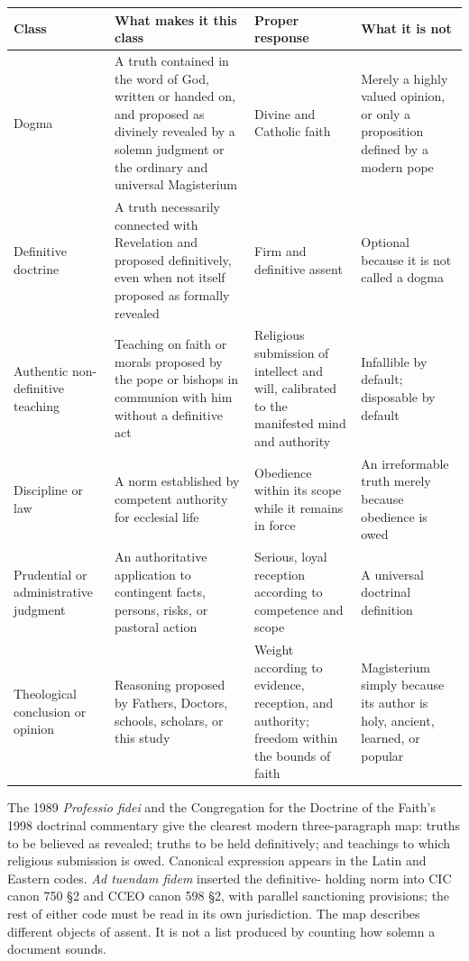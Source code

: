 \begin{longtable}{>{\raggedright\arraybackslash}p{}>{\raggedright\arraybackslash}p{}>{\raggedright\arraybackslash}p{}>{\raggedright\arraybackslash}p{}}
\toprule
Class & What makes it this class & Proper response & What it is not\\
\midrule
\endhead
Dogma & A truth contained in the word of God, written or handed on, and
proposed as divinely revealed by a solemn judgment or the ordinary and
universal Magisterium & Divine and Catholic faith & Merely a highly valued
opinion, or only a proposition defined by a modern pope\\
Definitive doctrine & A truth necessarily connected with Revelation and
proposed definitively, even when not itself proposed as formally revealed &
Firm and definitive assent & Optional because it is not called a dogma\\
Authentic non-definitive teaching & Teaching on faith or morals proposed by
the pope or bishops in communion with him without a definitive act &
Religious submission of intellect and will, calibrated to the manifested mind
and authority & Infallible by default; disposable by default\\
Discipline or law & A norm established by competent authority for ecclesial
life & Obedience within its scope while it remains in force & An irreformable
truth merely because obedience is owed\\
Prudential or administrative judgment & An authoritative application to
contingent facts, persons, risks, or pastoral action & Serious, loyal reception
according to competence and scope & A universal doctrinal definition\\
Theological conclusion or opinion & Reasoning proposed by Fathers, Doctors,
schools, scholars, or this study & Weight according to evidence, reception,
and authority; freedom within the bounds of faith & Magisterium simply because
its author is holy, ancient, learned, or popular\\
\bottomrule
\end{longtable}

The 1989 \emph{Professio fidei} and the Congregation for the Doctrine of the
Faith's 1998 doctrinal commentary give the clearest modern three-paragraph map:
truths to be believed as revealed; truths to be held definitively; and
teachings to which religious submission is owed. Canonical expression appears
in the Latin and Eastern codes. \emph{Ad tuendam fidem} inserted the definitive-
holding norm into CIC canon 750 \S2 and CCEO canon 598 \S2, with parallel
sanctioning provisions; the rest of either code must be read in its own
jurisdiction. The map describes different objects of assent. It is not a list
produced by counting how solemn a document sounds.

